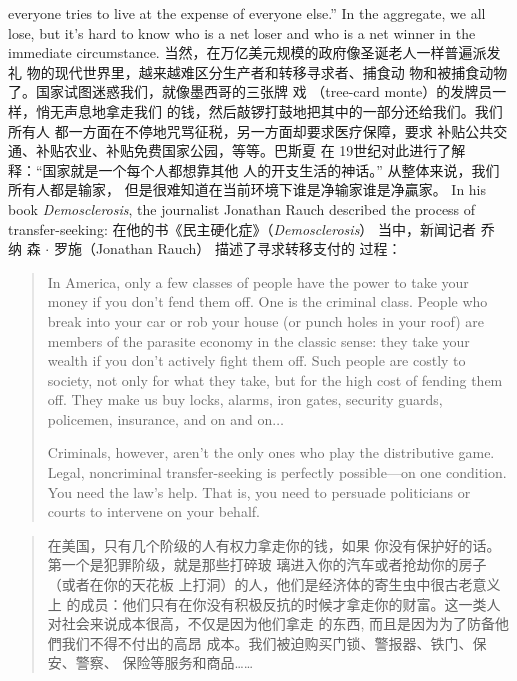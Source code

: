 \begin{paracol}{2}
everyone tries to live at the expense of everyone else.'' In the aggregate, we all lose, but it's hard to know who is a net loser and
who is a net winner in the immediate circumstance.
\switchcolumn
当然，在万亿美元规模的政府像圣诞老人一样普遍派发礼
物的现代世界里，越来越难区分生产者和转移寻求者、捕食动
物和被捕食动物了。国家试图迷惑我们，就像墨西哥的三张牌
戏 （tree-card monte）的发牌员一样，悄无声息地拿走我们
的钱，然后敲锣打鼓地把其中的一部分还给我们。我们所有人
都一方面在不停地咒骂征税，另一方面却要求医疗保障，要求
补贴公共交通、补贴农业、补贴免费国家公园，等等。巴斯夏
在 19世纪对此进行了解释：“国家就是一个每个人都想靠其他
人的开支生活的神话。” 从整体来说，我们所有人都是输家，
但是很难知道在当前环境下谁是净输家谁是净贏家。
\switchcolumn*
In his book\textit{ Demosclerosis}, the journalist Jonathan Rauch described the process of transfer-seeking:
\switchcolumn
在他的书《民主硬化症》（\textit{Demosclerosis}） 当中，新闻记者 乔 纳 森 $\cdot$ 罗施（Jonathan Rauch） 描述了寻求转移支付的
过程：
\switchcolumn*
\begin{quotation}
In America, only a few classes of people have the power to take
your money if you don't fend them off. One is the criminal class.
People who break into your car or rob your house (or punch holes
in your roof) are members of the parasite economy in the classic
sense: they take your wealth if you don't actively fight them off.
Such people are costly to society, not only for what they take, but
for the high cost of fending them off. They make us buy locks,
alarms, iron gates, security guards, policemen, insurance, and on
and on$\ldots$


Criminals, however, aren't the only ones who play the distributive game. Legal, noncriminal transfer-seeking is perfectly possible---on one condition. You need the law's help. That is, you
need to persuade politicians or courts to intervene on your behalf.
\end{quotation}
\switchcolumn
\begin{quotation}
在美国，只有几个阶级的人有权力拿走你的钱，如果
你没有保护好的话。第一个是犯罪阶级，就是那些打碎玻
璃进入你的汽车或者抢劫你的房子（或者在你的天花板
上打洞）的人，他们是经济体的寄生虫中很古老意义上
的成员：他们只有在你没有积极反抗的时候才拿走你的财富。这一类人对社会来说成本很高，不仅是因为他们拿走
的东西, 而且是因为为了防备他們我们不得不付出的高昂
成本。我们被迫购买门锁、警报器、铁门、保安、警察、
保险等服务和商品……


\end{quotation}
\end{paracol}
